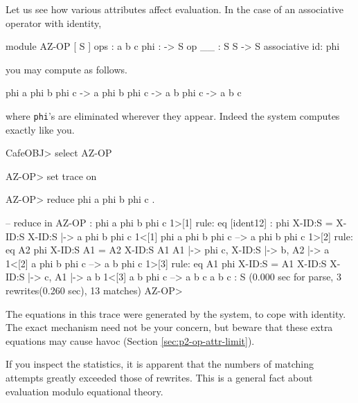 \documentclass[a4paper]{memoir}
\begin{document}
Let us see how various attributes affect evaluation. In the case of
an associative operator with identity,\label{exs:az-op}
\begin{vvtm}
\begin{ccode}
  module AZ-OP {
   [ S ]
   ops : a b c phi : -> S
   op __ : S S -> S { associative id: phi }
  }

\end{ccode}
\end{vvtm}
you may compute as follows.
\begin{vvtm}
\begin{ccode}
  phi a phi b phi c ->
  a phi b phi c ->
  a b phi c ->
  a b c
\end{ccode}
\end{vvtm}
where \verb|phi|'s are eliminated wherever they appear.
Indeed the system computes exactly like you.
\begin{vvtm}
\begin{ccode}
  CafeOBJ> select AZ-OP

  AZ-OP> set trace on

  AZ-OP> reduce phi a phi b phi c .

  -- reduce in AZ-OP : phi a phi b phi c
  1>[1] rule: eq [ident12] : phi X-ID:S = X-ID:S
      { X-ID:S |-> a phi b phi c }
  1<[1] phi a phi b phi c --> a phi b phi c
  1>[2] rule: eq A2 phi X-ID:S A1 = A2 X-ID:S A1
      { A1 |-> phi c, X-ID:S |-> b, A2 |-> a }
  1<[2] a phi b phi c --> a b phi c
  1>[3] rule: eq A1 phi X-ID:S = A1 X-ID:S
      { X-ID:S |-> c, A1 |-> a b }
  1<[3] a b phi c --> a b c
  a b c : S
  (0.000 sec for parse, 3 rewrites(0.260 sec), 13 matches)
  AZ-OP> 
\end{ccode}
\end{vvtm}
The equations in this trace were generated by the system, to cope with
identity. The exact mechanism need not be your
concern, but beware that these extra equations may cause havoc
(Section \ref{sec:p2-op-attr-limit}).

If you inspect the statistics, it is apparent that the numbers of
matching attempts greatly exceeded those of rewrites. This is a general
fact about evaluation modulo equational theory.
\end{document}
